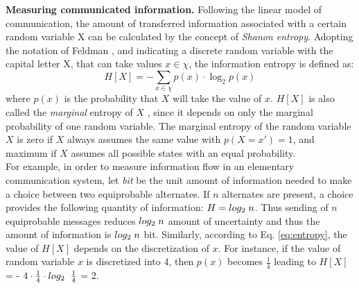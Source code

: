 \textbf{Measuring communicated information.} Following the linear model of communication, the amount of transferred information associated with a certain random variable X can be calculated by the concept of {\em Shanon entropy}. Adopting the notation of Feldman \cite{Feldman1997}, and indicating a discrete random variable with the capital letter X, that can take values $x \in \chi$, the information entropy is defined as:
\begin{equation}
\label{eq:entropy}
H[X] = - \sum_{x \in \chi } p(x) \cdot  \log_{2} p(x)
\end{equation}
where $p(x)$ is the probability that $X$ will take the value of $x$. $H[X]$ is also called the {\em marginal} entropy of $X$ , since it depends on only the marginal probability of one random variable. The marginal entropy of the random variable $X$ is zero if $X$  always assumes the same value with $p(X =x′)= 1$, and maximum if $X$  assumes all possible states with an equal probability.\\
For example, in order to measure information flow in an elementary communication system, let {\em bit} be the unit amount of information needed to make a choice between two equiprobable alternates. If $n$ alternates are present, a choice provides the following quantity of information: $H = log_{2} \hspace{1mm} n $. Thus sending of $n$ equiprobable messages reduces $log_{2} \hspace{1mm} n $ amount of uncertainty and thus the amount of information is  $log_{2} \hspace{1mm} n $ bit.  Similarly, according to Eq. \ref{eq:entropy}, the value of $H[X]$ depends on the discretization of $x$. For instance, if the value of random variable $x$ is discretized into 4, then $p(x)$ becomes $\frac{1}{4}$  leading to $H[X]$ = - $ 4 \cdot \frac{1}{4} \cdot log_{2} \hspace{2mm} \frac{1}{4}$  = 2.\\
